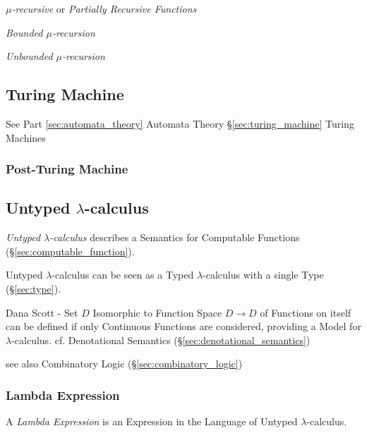 \emph{$\mu$-recursive} or \emph{Partially Recursive Functions}

\emph{Bounded $\mu$-recursion}

\emph{Unbounded $\mu$-recursion}



\subsection{Turing Machine}

See Part \ref{sec:automata_theory} Automata Theory
\S\ref{sec:turing_machine} Turing Machines



\subsubsection{Post-Turing Machine}\label{sec:post_turing}



\subsection{Untyped $\lambda$-calculus}\label{sec:untyped_lambda}

\emph{Untyped $\lambda$-calculus} describes a Semantics for Computable
Functions (\S\ref{sec:computable_function}).

Untyped $\lambda$-calculus can be seen as a Typed $\lambda$-calculus
with a single Type (\S\ref{sec:type}).

Dana Scott - Set $D$ Isomorphic to Function Space $D \rightarrow D$ of
Functions on itself can be defined if only Continuous Functions are
considered, providing a Model for $\lambda$-calculus. cf. Denotational
Semantics (\S\ref{sec:denotational_semantics})

see also Combinatory Logic (\S\ref{sec:combinatory_logic})



\subsubsection{Lambda Expression}\label{sec:lambda_expression}

A \emph{Lambda Expression} is an Expression in the Language of Untyped
$\lambda$-calculus.

